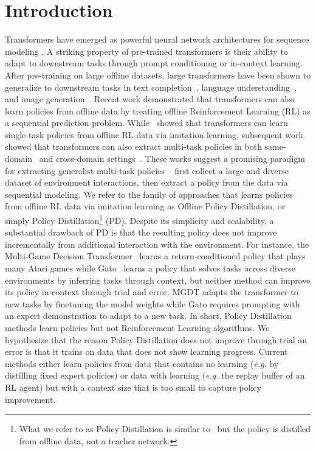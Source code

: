 \documentclass{article}
\theoremstyle{thm}
\begin{document}
\section{Introduction}
\label{sec:Introduction}
Transformers have emerged as powerful neural network architectures for sequence modeling \citep{vaswani2017attention}. A striking property of pre-trained transformers is their ability to adapt to downstream tasks through prompt conditioning or in-context learning.
After pre-training on large offline datasets, large transformers have been shown to generalize to downstream tasks in text completion~\citep{brown2020gpt3}, language understanding~\citep{devlin2018bert}, and image generation~\citep{yu2022parti}.
Recent work demonstrated that transformers can also learn policies from offline data by treating offline Reinforcement Learning (RL) as a sequential prediction problem. While~\citet{chen2021dt} showed that transformers can learn single-task policies from offline RL data via imitation learning, subsequent work showed that transformers can also extract multi-task policies in both same-domain~\citep{lee2022mgdt} and cross-domain settings~\citep{reed2022gato}. These works suggest a promising paradigm for extracting generalist multi-task policies – first collect a large and diverse dataset of environment interactions, then extract a policy from the data via sequential modeling. We refer to the family of approaches that learns policies from offline RL data via imitation learning as Offline Policy Distillation, or simply Policy Distillation\footnote{What we refer to as Policy Distillation is similar to~\citet{rusu16pd} but the policy is distilled from offline data, not a teacher network.} (PD).
Despite its simplicity and scalability, a substantial drawback of PD is that the resulting policy does not improve incrementally from additional interaction with the environment. For instance, the Multi-Game Decision Transformer~\citep[MGDT,][]{lee2022mgdt} learns a return-conditioned policy that plays many Atari games while Gato~\citep{reed2022gato} learns a policy that  solves tasks across diverse environments by inferring tasks through context, but neither method can improve its policy in-context through trial and error. MGDT adapts the transformer to new tasks by finetuning the model weights while Gato requires prompting with an expert demonstration to adapt to a new task. In short, Policy Distillation methods learn policies but not Reinforcement Learning algorithms.
We hypothesize that the reason Policy Distillation does not improve through trial an error is that it trains on data that does not show learning progress. Current methods either learn policies from data that contains no learning ({\it e.g.} by distilling fixed expert policies) or data with learning ({\it e.g.} the replay buffer of an RL agent) but with a context size that is too small to capture policy improvement.
\end{document}
